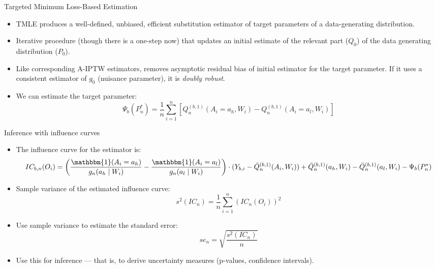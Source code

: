 \documentclass[12pt,t]{beamer}
\begin{document}
\begin{frame}[c]{Targeted Minimum Loss-Based Estimation}

\begin{center}
\begin{itemize}
  \itemsep12pt
  \item TMLE produces a well-defined, unbiased, efficient substitution estimator
    of target parameters of a data-generating distribution.
  \item Iterative procedure (though there is a one-step now) that updates an
    initial estimate of the relevant part ($Q_0$) of the data generating
    distribution ($P_0$).
  \item Like corresponding A-IPTW estimators, removes asymptotic residual bias
    of initial estimator for the target parameter. If it uses a consistent
    estimator of $g_0$ (nuisance parameter), it is \textit{doubly robust}.
  \item We can estimate the target parameter:
    \[
      \Psi_b(P_n^*) = \frac{1}{n}\sum_{i=1}^{n}[Q_n^{(b,1)}(A_i = a_h, W_i) -
      Q_n^{(b,1)}(A_i = a_l, W_i)]
    \]
\end{itemize}
\end{center}

\end{frame}




\begin{frame}[c]{Inference with influence curves}

\begin{center}
\begin{itemize}
  \itemsep12pt
  \item The influence curve for the estimator is:
  \begin{dmath}
    IC_{b,n}(O_i) = \left (\frac{\mathbbm{1}(A_i = a_{h})}{g_n(a_{h} \mid W_i)}
    - \frac{\mathbbm{1}(A_i = a_{l})}{g_n (a_{l} \mid W_i)} \right) \cdot
    (Y_{b,i} - \bar{Q}^{(b,1)}_n(A_i, W_i)) +
    \bar{Q}^{(b,1)}_n(a_{h}, W_i) - \bar{Q}^{(b,1)}_n(a_{l}, W_i) -
    \Psi_{b}(P_n^*)
  \end{dmath}
  \item Sample variance of the estimated influence curve:
    \[
      \textstyle s^2(IC_n) = \frac{1}{n}\sum_{i=1}^n\left(IC_n(O_i) \right)^2
    \]
  \item Use sample variance to estimate the standard error:
    \[
      se_n = \sqrt{\frac{s^2(IC_n)}{n}}
    \]
  \item Use this for inference --- that is, to derive uncertainty measures
    (p-values, confidence intervals).
\end{itemize}
\end{center}

\end{frame}
\end{document}
